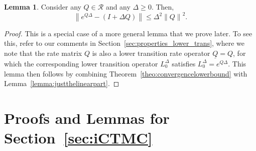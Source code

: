 \documentclass[10pt,a4paper]{paper}
\theoremstyle{definition}
\newtheorem{lemma}[theorem]{Lemma}
\newcommand{\reals}{\mathbb{R}}
\newcommand{\realspos}{\reals_{>0}}
\newcommand{\lrate}{\underline{Q}}
\newcommand{\norm}[1]{\left\lVert #1 \right\rVert}
\newcommand{\coloneqq}{:\!=}
\begin{document}
\begin{lemma}\label{lemma:linearpartofexponential}
Consider any $Q\in\mathcal{R}$ and any $\Delta\geq0$. Then,
\begin{equation*}
\norm{e^{Q\Delta}-(I+\Delta Q)}\leq
\Delta^2\norm{Q}^2.
\end{equation*}
\end{lemma}
\begin{proof}
This is a special case of a more general lemma that we prove later. To see this, refer to our comments in Section~\ref{sec:properties_lower_trans}, where we note that the rate matrix $Q$ is also a lower transition rate operator $\lrate=Q$, for which the corresponding lower transition operator $L_0^{\Delta}$ satisfies $L_0^{\Delta}=e^{Q\Delta}$. This lemma then follows by combining Theorem~\ref{theo:convergencelowerbound} with Lemma~\ref{lemma:justthelinearpart}.
%
\end{proof}

\section{Proofs and Lemmas for Section~\ref{sec:iCTMC}}
\end{document}
